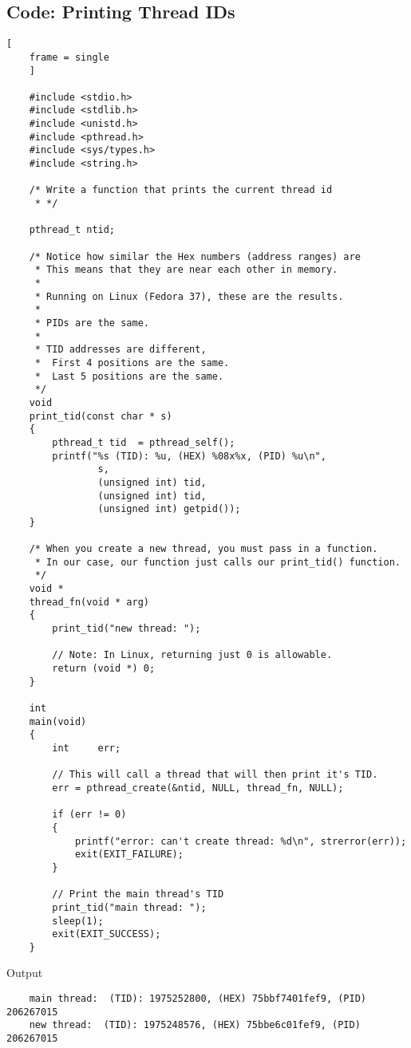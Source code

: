 \documentclass{article}
\begin{document}
\subsection{Code: Printing Thread IDs}
\begin{lstlisting}[
    frame = single
    ]

    #include <stdio.h>
    #include <stdlib.h>
    #include <unistd.h>
    #include <pthread.h>
    #include <sys/types.h>
    #include <string.h>

    /* Write a function that prints the current thread id 
     * */

    pthread_t ntid;

    /* Notice how similar the Hex numbers (address ranges) are
     * This means that they are near each other in memory.
     *
     * Running on Linux (Fedora 37), these are the results.
     *
     * PIDs are the same.
     *
     * TID addresses are different,
     *  First 4 positions are the same.
     *  Last 5 positions are the same.
     */
    void 
    print_tid(const char * s)
    {
        pthread_t tid  = pthread_self();
        printf("%s (TID): %u, (HEX) %08x%x, (PID) %u\n", 
                s, 
                (unsigned int) tid,
                (unsigned int) tid,
                (unsigned int) getpid());
    }

    /* When you create a new thread, you must pass in a function.
     * In our case, our function just calls our print_tid() function.
     */
    void *
    thread_fn(void * arg)
    {
        print_tid("new thread: ");

        // Note: In Linux, returning just 0 is allowable.
        return (void *) 0;
    }

    int
    main(void)
    {
        int 	err;

        // This will call a thread that will then print it's TID.
        err = pthread_create(&ntid, NULL, thread_fn, NULL);

        if (err != 0)
        {
            printf("error: can't create thread: %d\n", strerror(err));
            exit(EXIT_FAILURE);
        }

        // Print the main thread's TID
        print_tid("main thread: ");
        sleep(1);
        exit(EXIT_SUCCESS);
    }

\end{lstlisting}
\large{Output}
\begin{verbatim}
    main thread:  (TID): 1975252800, (HEX) 75bbf7401fef9, (PID) 206267015
    new thread:  (TID): 1975248576, (HEX) 75bbe6c01fef9, (PID) 206267015
\end{verbatim}
\end{document}
